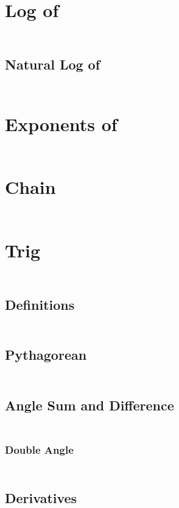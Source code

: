 \documentclass{report}
\begin{document}
    \section{Log of}
    \begin{gather*}
    \end{gather*}

    \subsection{Natural Log of}
    \begin{gather*}
    \end{gather*}

    \section{Exponents of}
    \begin{gather*}
    \end{gather*}

    \section{Chain}
    \begin{gather*}
    \end{gather*}

    \section{Trig}
    \begin{gather*}
    \end{gather*}

    \subsection{Definitions}
    \begin{gather*}
    \end{gather*}

    \subsection{Pythagorean}
    \begin{gather*}
    \end{gather*}

    \subsection{Angle Sum and Difference}
    \begin{gather*}
    \end{gather*}

    \subsubsection{Double Angle}
    \begin{gather*}
    \end{gather*}

    \subsection{Derivatives}
    \begin{gather*}
    \end{gather*}
\end{document}
